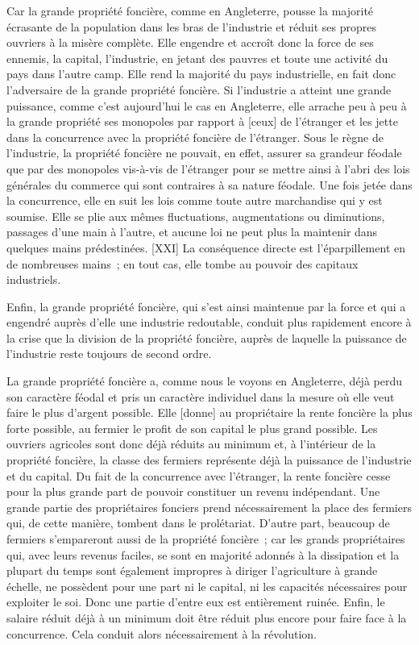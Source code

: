 \documentclass[french,twoside]{book} %
\begin{document}
Car la grande propriété foncière, comme en Angleterre, pousse la majorité écrasante de la population dans les bras de l’industrie et réduit ses propres ouvriers à la misère complète. Elle engendre et accroît donc la force de ses ennemis, la capital, l’industrie, en jetant des pauvres et toute une activité du pays dans l’autre camp. Elle rend la majorité du pays industrielle, en fait donc l’adversaire de la grande propriété foncière. Si l’industrie a atteint une grande puissance, comme c’est aujourd’hui le cas en Angleterre, elle arrache peu à peu à la grande propriété ses monopoles par rapport à [ceux] de l’étranger et les jette dans la concurrence avec la propriété foncière de l’étranger. Sous le règne de l’industrie, la propriété foncière ne pouvait, en effet, assurer sa grandeur féodale que par des monopoles vis-à-vis de l’étranger pour se mettre ainsi à l’abri des lois générales du commerce qui sont contraires à sa nature féodale. Une fois jetée dans la concurrence, elle en suit les lois comme toute autre marchandise qui y est soumise. Elle se plie aux mêmes fluctuations, augmentations ou diminutions, passages d’une main à l’autre, et aucune loi ne peut plus la maintenir dans quelques mains prédestinées. [XXI] La conséquence directe est l’éparpillement en de nombreuses mains ; en tout cas, elle tombe au pouvoir des capitaux industriels.\par
Enfin, la grande propriété foncière, qui s’est ainsi maintenue par la force et qui a engendré auprès d’elle une industrie redoutable, conduit plus rapidement encore à la crise que la division de la propriété foncière, auprès de laquelle la puissance de l’industrie reste toujours de second ordre.\par
La grande propriété foncière a, comme nous le voyons en Angleterre, déjà perdu son caractère féodal et pris un caractère individuel dans la mesure où elle veut faire le plus d’argent possible. Elle [donne] au propriétaire la rente foncière la plus forte possible, au fermier le profit de son capital le plus grand possible. Les ouvriers agricoles sont donc déjà réduits au minimum et, à l’intérieur de la propriété foncière, la classe des fermiers représente déjà la puissance de l’industrie et du capital. Du fait de la concurrence avec l’étranger, la rente foncière cesse pour la plus grande part de pouvoir constituer un revenu indépendant. Une grande partie des propriétaires fonciers prend nécessairement la place des fermiers qui, de cette manière, tombent dans le prolétariat. D’autre part, beaucoup de fermiers s’empareront aussi de la propriété foncière ; car les grands propriétaires qui, avec leurs revenus faciles, se sont en majorité adonnés à la dissipation et la plupart du temps sont également impropres à diriger l’agriculture à grande échelle, ne possèdent pour une part ni le capital, ni les capacités nécessaires pour exploiter le soi. Donc une partie d’entre eux est entièrement ruinée. Enfin, le salaire réduit déjà à un minimum doit être réduit plus encore pour faire face à la concurrence. Cela conduit alors nécessairement à la révolution.\par
\end{document}
